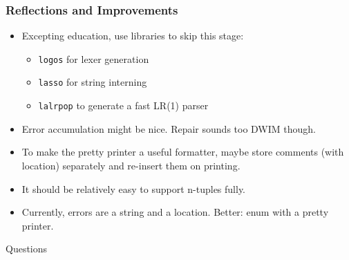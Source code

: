\documentclass{article}
\begin{document}
\begin{frame}
    \frametitle{Reflections and Improvements}
    \begin{itemize}[<+(1)->]
        \item Excepting education, use libraries to skip this stage:
            \begin{itemize}[<+(1)->]
                \item \texttt{logos} for lexer generation
                \item \texttt{lasso} for string interning
                \item \texttt{lalrpop} to generate a fast LR(1) parser
            \end{itemize}
        \item Error accumulation might be nice. Repair sounds too DWIM though.
        \item To make the pretty printer a useful formatter, maybe store
            comments (with location) separately and re-insert them on printing.
        \item It should be relatively easy to support n-tuples fully. 
        \item Currently, errors are a string and a location. Better: enum with a
            pretty printer.
    \end{itemize}
\end{frame}

\begin{frame}[plain,c]
    \begin{center}
    \Huge{Questions}
    \end{center}
\end{frame}
\end{document}
